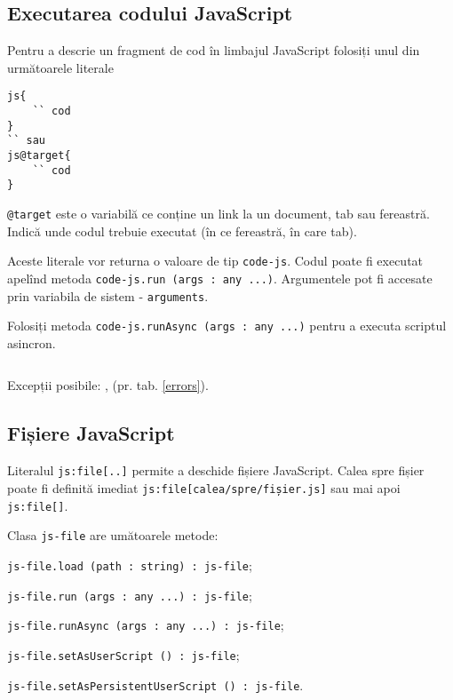 \subsection{Executarea codului JavaScript}

Pentru a descrie un fragment de cod în limbajul JavaScript folosiți unul din următoarele literale 
\begin{verbatim}
js{
	`` cod
}
`` sau
js@target{
	`` cod
}
\end{verbatim}

\texttt{@target} este o variabilă ce conține un link la un document, tab sau fereastră. Indică unde codul trebuie executat (în ce fereastră, în care tab).

Aceste literale vor returna o valoare de tip \texttt{code-js}. Codul poate fi executat apelînd metoda \texttt{code-js.run (args : any ...)}. Argumentele pot fi accesate prin variabila de sistem - \texttt{arguments}.

Folosiți metoda \texttt{code-js.runAsync (args : any ...)} pentru a executa scriptul asincron.

\begin{sourcecode}
    \label{jsrunex1}
    \inputminted[linenos]{icl}{../sources/jsrunex1.icL}
\end{sourcecode}

Excepții posibile: ,  (pr. tab. \ref{errors}).

\subsection{Fișiere JavaScript}

Literalul \texttt{js:file[..]} permite a deschide fișiere JavaScript. Calea spre fișier poate fi definită imediat \texttt{js:file[calea/spre/fișier.js]} sau mai apoi \texttt{js:file[]}.

Clasa \texttt{js-file} are umătoarele metode:
\begin{icItems}
\item \texttt{js-file.load (path : string) : js-file};
\item \texttt{js-file.run (args : any ...) : js-file};
\item \texttt{js-file.runAsync (args : any ...) : js-file};
\item \texttt{js-file.setAsUserScript () : js-file};
\item \texttt{js-file.setAsPersistentUserScript () : js-file}.
\end{icItems}


